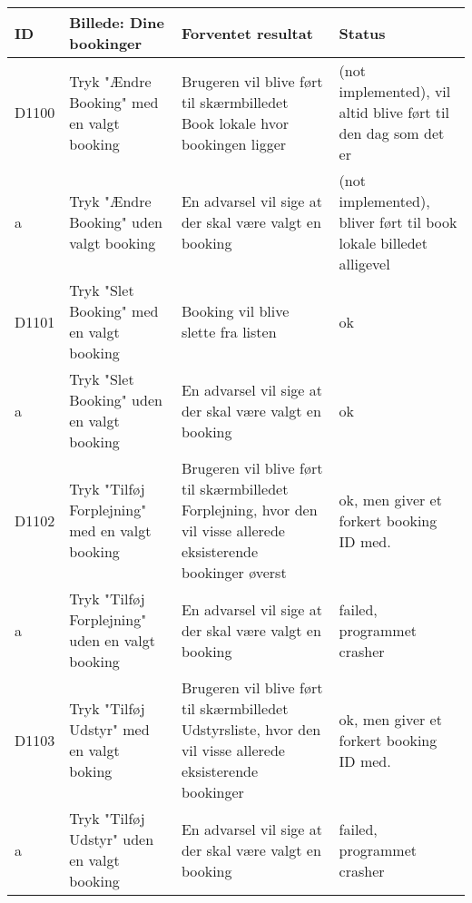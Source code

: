 \begin{tabularx}{\textwidth}{ |X|X|X|X| }
\hline
	ID & Billede: Dine bookinger  & Forventet resultat & Status\\ 
\hline
	D1100 & Tryk "Ændre Booking" med en valgt booking & Brugeren vil blive ført til skærmbilledet Book lokale hvor bookingen ligger &(not implemented), vil altid blive ført til den dag som det er \\
\hline
	a & Tryk "Ændre Booking" uden valgt booking & En advarsel vil sige at der skal være valgt en booking &(not implemented), bliver ført til book lokale billedet alligevel \\
\hline
	D1101 & Tryk "Slet Booking" med en valgt booking & Booking vil blive slette fra listen & ok \\
\hline
	a & Tryk "Slet Booking" uden en valgt booking & En advarsel vil sige at der skal være valgt en booking & ok \\
\hline
	D1102 & Tryk "Tilføj Forplejning" med en valgt booking & Brugeren vil blive ført til skærmbilledet Forplejning, hvor den vil visse allerede eksisterende bookinger øverst & ok, men giver et forkert booking ID med. \\
\hline
	a &  Tryk "Tilføj Forplejning" uden en valgt booking & En advarsel vil sige at der skal være valgt en booking &failed, programmet crasher \\
\hline
	D1103 & Tryk "Tilføj Udstyr" med en valgt boking & Brugeren vil blive ført til skærmbilledet Udstyrsliste, hvor den vil visse allerede eksisterende bookinger & ok, men giver et forkert booking ID med. \\
\hline
	a & Tryk "Tilføj Udstyr" uden en valgt booking & En advarsel vil sige at der skal være valgt en booking & failed, programmet crasher \\
\hline
\end{tabularx}